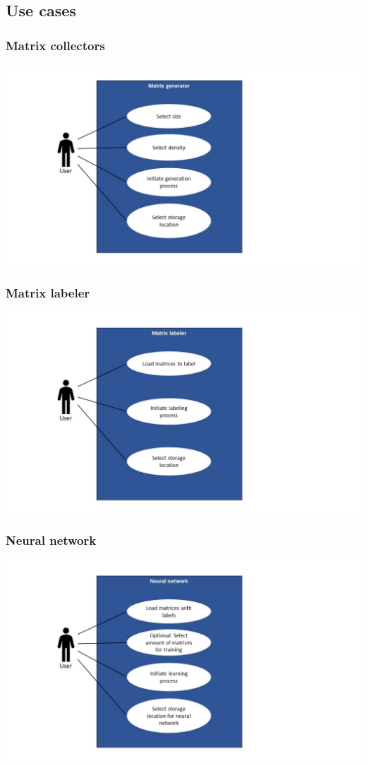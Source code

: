 \documentclass[parskip=full]{scrartcl}
\begin{document}
\subsection{Use cases}
\subsubsection{Matrix \glspl{collector}}
\includegraphics[width=1.3\textwidth]{useCase_generator}
\subsubsection{Matrix labeler}
\includegraphics[width=1.3\textwidth]{useCase_Labeler}
\subsubsection{Neural network}
\includegraphics[width=1.3\textwidth]{useCase_NeuralNetwork}
\end{document}
